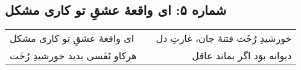 \begin{center}
\section*{شماره ۵: ای واقعۀ عشقِ تو کاری مشکل}
\label{sec:005}
\begin{longtable}{l p{0.5cm} r}
ای واقعهٔ عشقِ تو کاری مشکل
&&
خورشیدِ رُخَت فتنهٔ جان، غارتِ دل
\\
هرکاو نَفَسی بدید خورشیدِ رُخَت
&&
دیوانه بوَد اگر بماند عاقل
\\
\end{longtable}
\end{center}
